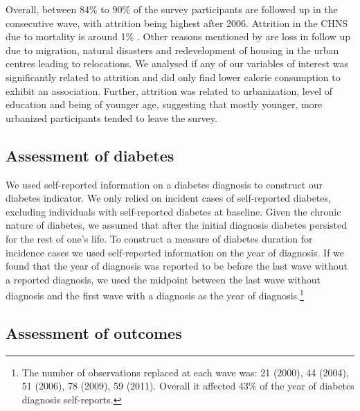 Overall, between 84\% to 90\% of the survey participants are followed up in the consecutive wave, with attrition being highest after 2006. Attrition in the \ac{CHNS} due to mortality is around 1\% \parencite{Popkin2010}. Other reasons mentioned by \textcite{Popkin2010} are loss in follow up due to migration, natural disasters and redevelopment of housing in the urban centres leading to relocations. We analysed if any of our variables of interest was significantly related to attrition and did only find lower calorie consumption to exhibit an association. Further, attrition was related to urbanization, level of education and being of younger age, suggesting that mostly younger, more urbanized participants tended to leave the survey. 


\subsection{Assessment of diabetes}

We used self-reported information on a diabetes diagnosis to construct our diabetes indicator. We only relied on incident cases of self-reported diabetes, excluding individuals with self-reported diabetes at baseline. Given the chronic nature of diabetes, we assumed that after the initial diagnosis diabetes persisted for the rest of one's life. To construct a measure of diabetes duration for incidence cases we used self-reported information on the year of diagnosis. If we found that the year of diagnosis was reported to be before the last wave without a reported diagnosis, we used the midpoint between the last wave without diagnosis and the first wave with a diagnosis as the year of diagnosis.\footnote{The number of observations replaced at each wave was: 21 (2000), 44 (2004), 51  (2006), 78 (2009), 59 (2011). Overall it affected 43\% of the year of diabetes diagnosis self-reports.}

\subsection{Assessment of outcomes}

